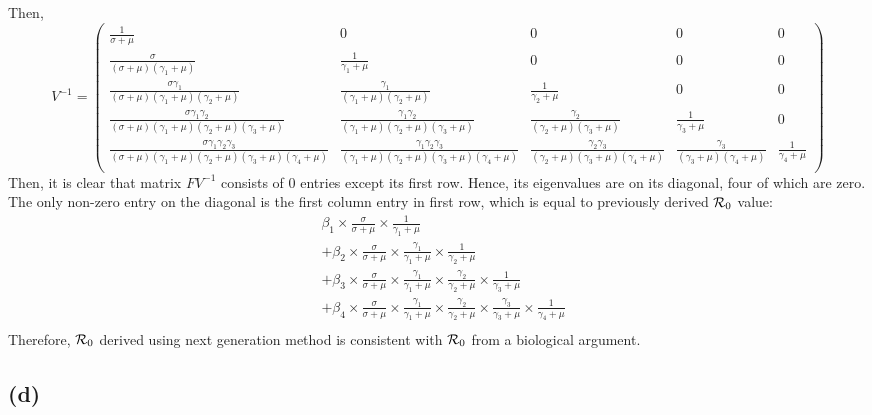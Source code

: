 \documentclass{article}
\begin{document}
Then,
$$
V^{-1} = \begin{pmatrix}
\frac{1}{\sigma + \mu} & 0 & 0 & 0 & 0\\
\frac{\sigma}{(\sigma + \mu)(\gamma_1 + \mu)} & \frac{1}{\gamma_1 + \mu} & 0 & 0 & 0\\
\frac{\sigma \gamma_1}{(\sigma + \mu)(\gamma_1 + \mu)(\gamma_2 + \mu)} & \frac{\gamma_1}{(\gamma_1 + \mu)(\gamma_2 + \mu)} & \frac{1}{\gamma_2 + \mu} & 0 & 0\\
\frac{\sigma \gamma_1 \gamma_2}{(\sigma + \mu)(\gamma_1 + \mu)(\gamma_2 + \mu)(\gamma_3 + \mu)} & \frac{\gamma_1 \gamma_2}{(\gamma_1 + \mu)(\gamma_2 + \mu)(\gamma_3 + \mu)} & \frac{\gamma_2}{(\gamma_2 + \mu)(\gamma_3 + \mu)} & \frac{1}{\gamma_3 + \mu} & 0\\
\frac{\sigma \gamma_1 \gamma_2 \gamma_3}{(\sigma + \mu)(\gamma_1 + \mu)(\gamma_2 + \mu)(\gamma_3 + \mu)(\gamma_4  +\mu)} & \frac{\gamma_1 \gamma_2 \gamma_3}{(\gamma_1 + \mu)(\gamma_2 + \mu)(\gamma_3 + \mu)(\gamma_4  +\mu)} & \frac{\gamma_2 \gamma_3}{(\gamma_2 + \mu)(\gamma_3 + \mu)(\gamma_4  +\mu)} & \frac{\gamma_3}{(\gamma_3 + \mu)(\gamma_4  +\mu)} & \frac{1}{\gamma_4  +\mu}\\
\end{pmatrix}
$$
Then, it is clear that matrix $FV^{-1}$ consists of 0 entries except its first row.
Hence, its eigenvalues are on its diagonal, four of which are zero. The only non-zero entry on the diagonal is the first column entry in first row, which is equal to previously derived ${\cal R}_0$ value:
$$
\begin{aligned}
&\beta_1 \times \frac{\sigma}{\sigma + \mu} \times \frac{1}{\gamma_1 + \mu}\\
&+ \beta_2 \times \frac{\sigma}{\sigma + \mu} \times \frac{\gamma_1}{\gamma_1 + \mu} \times \frac{1}{\gamma_2 + \mu}\\
&+ \beta_3 \times \frac{\sigma}{\sigma + \mu} \times \frac{\gamma_1}{\gamma_1 + \mu} \times \frac{\gamma_2}{\gamma_2 + \mu} \times \frac{1}{\gamma_3 + \mu}\\
&+ \beta_4 \times \frac{\sigma}{\sigma + \mu} \times \frac{\gamma_1}{\gamma_1 + \mu} \times \frac{\gamma_2}{\gamma_2 + \mu} \times \frac{\gamma_3}{\gamma_3 + \mu} \times \frac{1}{\gamma_4 + \mu}\\
\end{aligned}
$$
Therefore, ${\cal R}_0$ derived using next generation method is consistent with ${\cal R}_0$ from a biological argument.

\subsection*{(d)}
\end{document}
